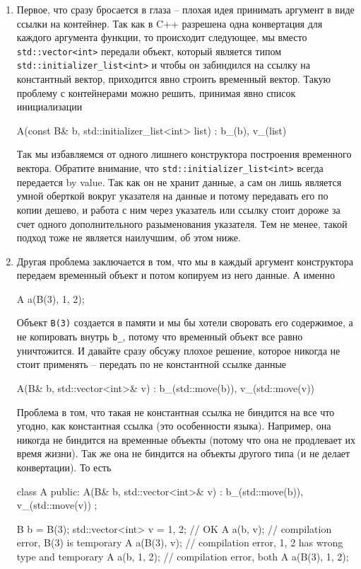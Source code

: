 \begin{enumerate}
\item Первое, что сразу бросается в глаза -- плохая идея принимать аргумент в виде ссылки на контейнер.
Так как в C++ разрешена одна конвертация для каждого аргумента функции, то происходит следующее, мы вместо \verb"std::vector<int>" передали объект, который является типом \verb"std::initializer_list<int>" и чтобы он забиндился на ссылку на константный вектор, приходится явно строить временный вектор.
Такую проблему с контейнерами можно решить, принимая явно список инициализации
\begin{cppcode}
A(const B& b, std::initializer_list<int> list)
  : b_(b), v_(list) {}
\end{cppcode}
Так мы избавляемся от одного лишнего конструктора построения временного вектора.
Обратите внимание, что \verb"std::initializer_list<int>" всегда передается by value.
Так как он не хранит данные, а сам он лишь является умной оберткой вокруг указателя на данные и потому передавать его по копии дешево, и работа с ним через указатель или ссылку стоит дороже за счет одного дополнительного разыменования указателя.
Тем не менее, такой подход тоже не является наилучшим, об этом ниже.

\item Другая проблема заключается в том, что мы в каждый аргумент конструктора передаем временный объект и потом копируем из него данные.
А именно
\begin{cppcode}
A a(B(3), {1, 2});
\end{cppcode}
Объект \verb"B(3)" создается в памяти и мы бы хотели своровать его содержимое, а не копировать внутрь \verb"b_", потому что временный объект все равно уничтожится.
И давайте сразу обсужу плохое решение, которое никогда не стоит применять -- передать по не константной ссылке данные
\begin{cppcode}
A(B& b, std::vector<int>& v)
 : b_(std::move(b)), v_(std::move(v)) {}
\end{cppcode}
Проблема в том, что такая не константная ссылка не биндится на все что угодно, как константная ссылка (это особенности языка).
Например, она никогда не биндится на временные объекты (потому что она не продлевает их время жизни).
Так же она не биндится на объекты другого типа (и не делает конвертации).
То есть
\begin{cppcode}
class A {
public:
  A(B& b, std::vector<int>& v)
   : b_(std::move(b)), v_(std::move(v)) {}
};

B b = B(3);
std::vector<int> v = {1, 2};
// OK
A a(b, v);
// compilation error, B(3) is temporary
A a(B(3), v);
// compilation error, {1, 2} has wrong type and temporary
A a(b, {1, 2});
// compilation error, both
A a(B(3), {1, 2});
\end{cppcode}


\end{enumerate}
